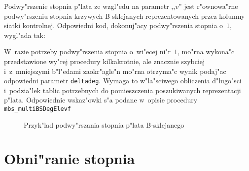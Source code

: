 Podwy"rszenie stopnia p"lata ze wzgl"edu na parametr ,,$v$'' jest
r"ownowa"rne podwy"rszeniu stopnia krzywych B-sklejanych reprezentowanych
przez kolumny siatki kontrolnej. Odpowiedni kod, dokonuj"acy podwy"rszenia
stopnia o~$1$, wygl"ada tak:

\vspace{\medskipamount}
\vspace{\medskipamount}

W~razie potrzeby podwy"rszenia stopnia o~wi"ecej ni"r~$1$, mo"rna wykona"c
przedstawione wy"rej procedury kilkakrotnie, ale znacznie szybciej
i~z~mniejszymi b"l"edami zaokr"agle"n mo"rna otrzyma"c wynik podaj"ac
odpowiedni parametr \texttt{deltadeg}. Wymaga to w"la"sciwego obliczenia
d"lugo"sci i~podzia"lek tablic potrzebnych do pomieszczenia poszukiwanych
reprezentacji p"lata. Odpowiednie wskaz"owki s"a podane w~opisie procedury
\texttt{mbs\_multiBSDegElevf}%
\begin{figure}[ht]
  \centerline{}
  \caption{Przyk"lad podwy"rszania stopnia p"lata B-sklejanego}
\end{figure}


\newpage
\section{Obni"ranie stopnia}

